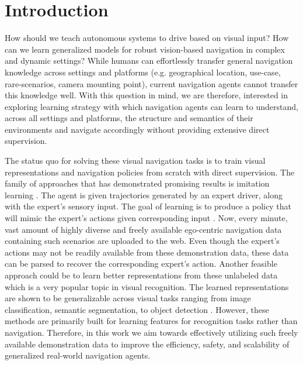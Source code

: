\documentclass[letterpaper, 12pt]{book}
\theoremstyle{definition}
\theoremstyle{definition}
\theoremstyle{definition}
\theoremstyle{definition}
\theoremstyle{definition}
\begin{document}
\clearpage 

\clearpage \tableofcontents \clearpage

\section{Introduction}
\label{sec:org1cf3344}
How should we teach autonomous systems to drive based on visual input? How can
we learn generalized models for robust vision-based navigation in complex and
dynamic settings? While humans can effortlessly transfer general navigation
knowledge across settings and platforms (e.g. geographical location, use-case,
rare-scenarios, camera mounting point), current navigation agents cannot
transfer this knowledge well. With this question in mind, we are therefore,
interested in exploring learning strategy with which navigation agents can learn
to understand, across all settings and platforms, the structure and semantics of
their environments and navigate accordingly without providing extensive direct
supervision.

The status quo for solving these visual navigation tasks is to train visual
representations and navigation policies from scratch with direct supervision.
The family of approaches that has demonstrated promising results is imitation
learning \cite{Chen2019,Codevilla2017}. The agent is given trajectories
generated by an expert driver, along with the expert's sensory input. The goal
of learning is to produce a policy that will mimic the expert’s actions given
corresponding input
\cite{article,Bojarski2016,7410669,chen2021learning,Gupta2017,Hawke2019,Li2018,Liang2018,Mueller2018,inproceedings,Osa2018,Pomerleau1988,Prakash2021,Zhang2021}.
Now, every minute, vast amount of highly diverse and freely available
ego-centric navigation data containing such scenarios are uploaded to the
web. Even though the expert's actions may not be readily available from these
demonstration data, these data can be parsed to recover the corresponding
expert's action.  Another feasible approach could be to learn better
representations from these unlabeled data which is a very popular topic in
visual recognition. The learned representations are shown to be generalizable
across visual tasks ranging from image classification, semantic segmentation, to
object detection \cite{Chen2020a,Grill2020,He2019,Caron2020,Caron2021}. However,
these methods are primarily built for learning features for recognition tasks
rather than navigation. Therefore, in this work we aim towards effectively
utilizing such freely available demonstration data to improve the efficiency,
safety, and scalability of generalized real-world navigation agents.
\end{document}
